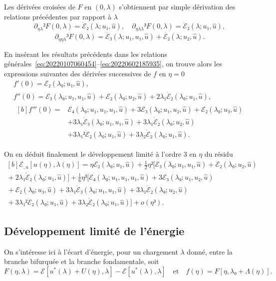 \documentclass[12pt, final]{scrartcl}
\theoremstyle{definition}
\begin{document}
Les dérivées croisées de \(F\) en \((0, λ)\) s'obtiennent par simple dérivation
des relations précédentes par rapport à \(λ\)
\[∂_{ηλ}² F(0, λ) = \dot{ℰ}₂(λ; u₁, \hat{u}), \quad ∂_{ηλλ}³ F(0, λ) = \ddot{ℰ}₂(λ; u₁, \hat{u}),\]
\[∂_{ηηλ}³ F(0, λ) = \dot{ℰ}₃(λ; u₁, u₁, \hat{u}) + \dot{ℰ₂}(λ; u₂, \hat{u}).\]

En insérant les résultats précédents dans les relations
générales~\eqref{eq:20220107060454}--\eqref{eq:20220602185935}, on trouve alors
les expressions suivantes des dérivées successives de \(f\) en \(η = 0\)
\begin{gather*}
  f'(0) = ℰ₂(λ₀; u₁, \hat{u}),\\
  f''(0) = ℰ₃(λ₀; u₁, u₁, \hat{u}) + ℰ₂(λ₀; u₂, \hat{u}) + 2 λ₁ \dot{ℰ}₂(λ₀; u₁, \hat{u}),\\
  \begin{aligned}[b]
    f'''(0) ={}
    & ℰ₄(λ₀; u₁, u₁, u₁, \hat{u}) + 3ℰ₃(λ₀; u₁, u₂, \hat{u}) + ℰ₂(λ₀ ; u₃, \hat{u})\\
    & + 3λ₁ \dot{ℰ}₃(λ₀; u₁, u₁, \hat{u}) + 3λ₁ \dot{ℰ}₂(λ₀; u₂, \hat{u})\\
    & + 3 λ₁² \ddot{ℰ}₂(λ₀; u₁, \hat{u}) + 3 λ₂ \dot{ℰ}₂(λ₀; u₁, \hat{u}).
  \end{aligned}
\end{gather*}

On en déduit finalement le développement limité à l'ordre 3 en \(η\) du résidu
\begin{equation}
  \label{eq:20220107080901}
  \begin{gathered}[b]
    ℰ_{, u}[u(η), λ(η)] ={} η ℰ₂(λ₀; u₁, \hat{u}) + \tfrac{1}{2} η² \bigl[ℰ₃(λ₀; u₁, u₁, \hat{u})  + ℰ₂(λ₀; u₂, \hat{u})\\
    {} + 2 λ₁ \dot{ℰ}₂(λ₀; u₁, \hat{u})\bigr] + \tfrac{1}{6} η³ \bigl[ ℰ₄(λ₀; u₁, u₁, u₁, \hat{u}) + 3ℰ₃(λ₀; u₁, u₂, \hat{u})\\
    {} + ℰ₂(λ₀; u₃, \hat{u}) + 3λ₁ \dot{ℰ}₃(λ₀; u₁, u₁, \hat{u}) + 3λ₁ \dot{ℰ}₂(λ₀; u₂, \hat{u})\\
    {} + 3 λ₁² \ddot{ℰ}₂(λ₀; u₁, \hat{u}) + 3 λ₂ \dot{ℰ}₂(λ₀ ; u₁, \hat{u}) \bigr] + o(η³).
  \end{gathered}
\end{equation}

\subsection{Développement limité de l'énergie}
\label{sec:20220525053434}

On s'intéresse ici à l'écart d'énergie, pour un chargement \(λ\) donné, entre la
branche bifurquée et la branche fondamentale, soit
\begin{equation}
  F(η, λ) = ℰ[u^{\ast}(λ) + U(η), λ] - ℰ[u^{\ast}(λ), λ]
  \quad \text{et} \quad
  f(η) = F [η, λ₀ + Λ(η)].
\end{equation}
\end{document}
